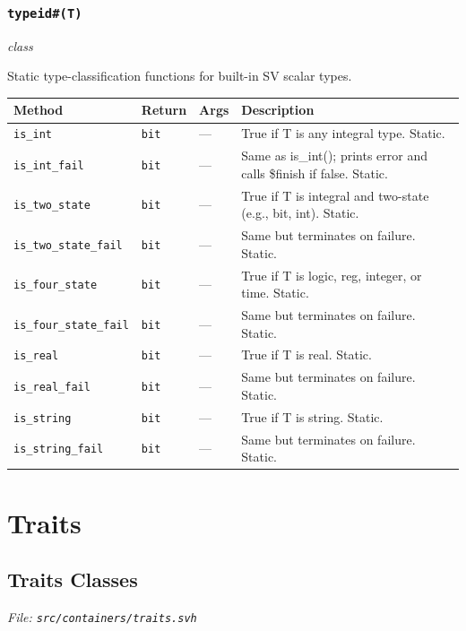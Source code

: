 \documentclass[11pt,letterpaper]{report}
\begin{document}
\subsection*{\texttt{typeid\#(T)}}
\noindent\small\textit{class}\par

Static type-classification functions for built-in SV scalar types.

\begin{xltabular}{\linewidth}{>{\small}p{1.35in} >{\small}p{1.25in} >{\small}p{0.95in} >{\small}X}
\toprule
\textbf{Method} & \textbf{Return} & \textbf{Args} & \textbf{Description} \\
\midrule
\endhead
\bottomrule
\endfoot
\texttt{is\_int} & \texttt{bit} & --- & True if T is any integral type. Static. \\
\texttt{is\_int\_fail} & \texttt{bit} & --- & Same as is\_int(); prints error and calls \$finish if false. Static. \\
\texttt{is\_two\_state} & \texttt{bit} & --- & True if T is integral and two-state (e.g., bit, int). Static. \\
\texttt{is\_two\_state\_fail} & \texttt{bit} & --- & Same but terminates on failure. Static. \\
\texttt{is\_four\_state} & \texttt{bit} & --- & True if T is logic, reg, integer, or time. Static. \\
\texttt{is\_four\_state\_fail} & \texttt{bit} & --- & Same but terminates on failure. Static. \\
\texttt{is\_real} & \texttt{bit} & --- & True if T is real. Static. \\
\texttt{is\_real\_fail} & \texttt{bit} & --- & Same but terminates on failure. Static. \\
\texttt{is\_string} & \texttt{bit} & --- & True if T is string. Static. \\
\texttt{is\_string\_fail} & \texttt{bit} & --- & Same but terminates on failure. Static. \\
\end{xltabular}

\chapter{Traits}
\section{Traits Classes}
\noindent\small\textit{File: \texttt{src/containers/traits.svh}}\par
\end{document}
